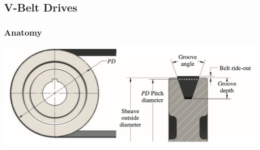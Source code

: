 \documentclass[11pt, fleqn]{article}
\begin{document}
\subsection{V-Belt Drives}
\subsubsection{Anatomy}
\includegraphics[scale=0.6]{Belts/v-belt_pd.png}
\end{document}
